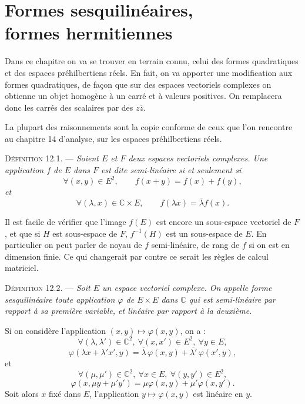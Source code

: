 \chapter[Formes sesquilinéaires, formes hermitiennes]{Formes sesquilinéaires,\\ formes hermitiennes}

Dans ce chapitre on va se trouver en terrain connu, celui des formes quadratiques et des espaces préhilbertiens réels. En fait, on va apporter une modification aux formes quadratiques, de façon que sur des espaces vectoriels complexes on obtienne un objet homogène à un carré et à valeurs positives. On remplacera donc les carrés des scalaires par des $z\overline z$.

La plupart des raisonnements sont la copie conforme de ceux que l'on rencontre au chapitre 14 d'analyse, sur les espaces préhilbertiens réels.


\medskip\noindent\textsc{Définition 12.1.} --- \emph{Soient $E$ et $F$ deux espaces vectoriels complexes. Une application $f$ de $E$ dans $F$ est dite semi-linéaire si et seulement si
\[
\forall(x,y)\in E^2,\qquad f(x+y)=f(x)+f(y),
\]
et
\[
\forall(\lambda,x)\in\mathbb C\times E,\qquad f(\lambda x)=\overline\lambda f(x).
\]}

Il est facile de vérifier que l'image $f(E)$ est encore un sous-espace vectoriel de $F$, et que si $H$ est sous-espace de $F$, $f^{-1}(H)$ est un sous-espace de $E$. En particulier on peut parler de noyau de $f$ semi-linéaire, de rang de $f$ si on est en dimension finie. Ce qui changerait par contre ce serait les règles de calcul matriciel.

\medskip\noindent\textsc{Définition 12.2.} --- \emph{Soit $E$ un espace vectoriel complexe. On appelle forme sesquilinéaire toute application $\varphi$ de $E\times E$ dans $\mathbb C$ qui est semi-linéaire par rapport à sa première variable, et linéaire par rapport à la deuxième.}

Si on considère l'application $(x,y)\longmapsto\varphi(x,y)$, on a :
\[
\forall(\lambda,\lambda')\in\mathbb C^2,\ \forall(x,x')\in E^2,\ \forall y\in E,
\]
\[
\varphi(\lambda x+\lambda'x',y)=\overline\lambda\,\varphi(x,y)+\overline{\lambda'}\,\varphi(x',y),
\]
et
\[
\forall(\mu,\mu')\in\mathbb C^2,\ \forall x\in E,\ \forall(y,y')\in E^2,
\]
\[
\varphi(x,\mu y+\mu'y')=\mu\varphi(x,y)+\mu'\varphi(x,y').
\]
Soit alors $x$ fixé dans $E$, l'application $y\longmapsto\varphi(x,y)$ est linéaire en $y$.

